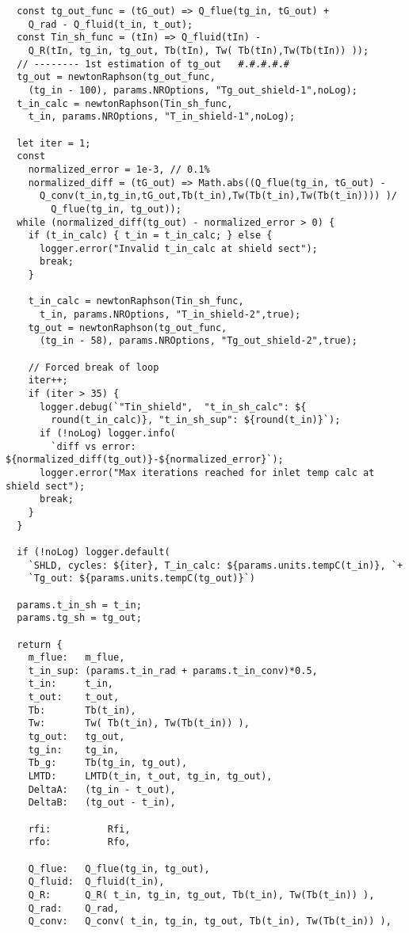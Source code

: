 \begin{verbatim}
  const tg_out_func = (tG_out) => Q_flue(tg_in, tG_out) + 
    Q_rad - Q_fluid(t_in, t_out);
  const Tin_sh_func = (tIn) => Q_fluid(tIn) - 
    Q_R(tIn, tg_in, tg_out, Tb(tIn), Tw( Tb(tIn),Tw(Tb(tIn)) ));
  // -------- 1st estimation of tg_out   #.#.#.#.#
  tg_out = newtonRaphson(tg_out_func, 
    (tg_in - 100), params.NROptions, "Tg_out_shield-1",noLog);
  t_in_calc = newtonRaphson(Tin_sh_func, 
    t_in, params.NROptions, "T_in_shield-1",noLog);

  let iter = 1;
  const 
    normalized_error = 1e-3, // 0.1%
    normalized_diff = (tG_out) => Math.abs((Q_flue(tg_in, tG_out) -
      Q_conv(t_in,tg_in,tG_out,Tb(t_in),Tw(Tb(t_in),Tw(Tb(t_in)))) )/ 
        Q_flue(tg_in, tg_out));
  while (normalized_diff(tg_out) - normalized_error > 0) {
    if (t_in_calc) { t_in = t_in_calc; } else {
      logger.error("Invalid t_in_calc at shield sect");
      break;
    }
    
    t_in_calc = newtonRaphson(Tin_sh_func, 
      t_in, params.NROptions, "T_in_shield-2",true);
    tg_out = newtonRaphson(tg_out_func, 
      (tg_in - 58), params.NROptions, "Tg_out_shield-2",true);

    // Forced break of loop
    iter++;
    if (iter > 35) {
      logger.debug(`"Tin_shield",  "t_in_sh_calc": ${
        round(t_in_calc)}, "t_in_sh_sup": ${round(t_in)}`);
      if (!noLog) logger.info(
        `diff vs error: ${normalized_diff(tg_out)}-${normalized_error}`);
      logger.error("Max iterations reached for inlet temp calc at shield sect");
      break;
    }
  }
  
  if (!noLog) logger.default(
    `SHLD, cycles: ${iter}, T_in_calc: ${params.units.tempC(t_in)}, `+
    `Tg_out: ${params.units.tempC(tg_out)}`)

  params.t_in_sh = t_in;
  params.tg_sh = tg_out;

  return {
    m_flue:   m_flue,
    t_in_sup: (params.t_in_rad + params.t_in_conv)*0.5,
    t_in:     t_in,
    t_out:    t_out,
    Tb:       Tb(t_in),
    Tw:       Tw( Tb(t_in), Tw(Tb(t_in)) ),
    tg_out:   tg_out,
    tg_in:    tg_in,
    Tb_g:     Tb(tg_in, tg_out),
    LMTD:     LMTD(t_in, t_out, tg_in, tg_out),
    DeltaA:   (tg_in - t_out),
    DeltaB:   (tg_out - t_in),

    rfi:          Rfi,
    rfo:          Rfo,

    Q_flue:   Q_flue(tg_in, tg_out),
    Q_fluid:  Q_fluid(t_in),
    Q_R:      Q_R( t_in, tg_in, tg_out, Tb(t_in), Tw(Tb(t_in)) ),
    Q_rad:    Q_rad,
    Q_conv:   Q_conv( t_in, tg_in, tg_out, Tb(t_in), Tw(Tb(t_in)) ),


\end{verbatim}
